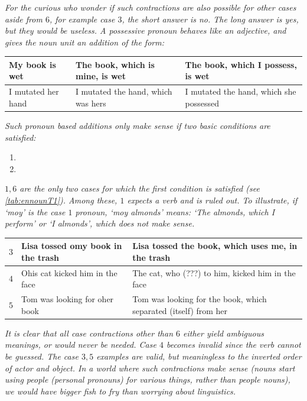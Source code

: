 \textit{For the curious who wonder if such contractions are also possible for other cases aside from  $6$, for example  case $3$, the short answer is no. The long answer is yes, but  they would be useless. A possessive pronoun  behaves like an adjective, and gives the noun unit  an addition of the form:}
\begin{example}
    \begin{tabular}{m{4cm}|m{5cm}|m{5cm}}
        My book is wet & The book, which is mine, is wet & The book, which I possess, is wet\\\hline
        I mutated her hand & I mutated the hand, which was hers & I mutated the hand, which she possessed
    \end{tabular}
\end{example} 
\textit{Such pronoun based additions only make sense if two basic conditions are satisfied:}
\begin{enumerate}
    \item {}
    \item {}
\end{enumerate}
\textit{$1,6$ are the only two cases for which the first condition is satisfied (see \autoref{tab:ennounT1}). Among these, $1$ expects a verb and is ruled out. To illustrate, if `moy' is the case $1$ pronoun, `moy almonds' means: `The almonds, which I perform' or `I almonds', which does not make sense.} 

\begin{example}
    \begin{tabular}{c|m{6cm}|m{7cm}}
$3$ & Lisa tossed omy book in the trash & Lisa tossed the book, which uses me, in the trash\\\hline
$4$ & Ohis cat kicked him in the face & The cat, who (???) to him, kicked him in the face\\\hline
$5$ & Tom was looking for oher book & Tom was looking for the book, which separated (itself) from her
    \end{tabular}
\end{example}
\textit{It is clear that all case contractions other than $6$ either yield ambiguous meanings, or would never be needed.  Case $4$  becomes invalid since the verb cannot be guessed.  The case $3, 5$ examples are valid, but meaningless  to the inverted order of actor and object. In a world where such contractions make sense (nouns start using people (personal pronouns) for various things, rather than people nouns), we would have bigger fish to fry than worrying about linguistics.}

